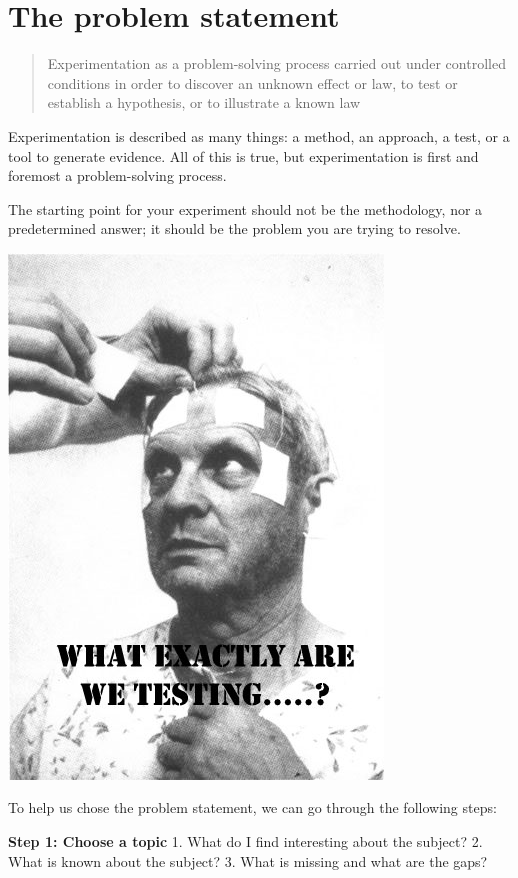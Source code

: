 \documentclass[]{book}
\begin{document}
\hypertarget{the-problem-statement}{%
\section{The problem statement}\label{the-problem-statement}}

\begin{quote}
Experimentation as a problem-solving process carried out under controlled conditions in order to discover an unknown effect or law, to test or establish a hypothesis, or to illustrate a known law
\end{quote}

Experimentation is described as many things: a method, an approach, a test, or a tool to generate evidence. All of this is true, but experimentation is first and foremost a problem-solving process.

The starting point for your experiment should not be the methodology, nor a predetermined answer; it should be the problem you are trying to resolve.

\includegraphics{fig/experiment-meme.jpg}

To help us chose the problem statement, we can go through the following steps:

\textbf{Step 1: Choose a topic}
1. What do I find interesting about the subject?
2. What is known about the subject?
3. What is missing and what are the gaps?
\end{document}
